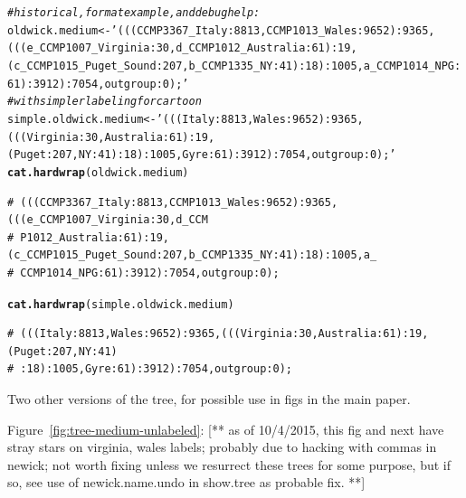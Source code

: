 \documentclass{article}\usepackage[]{graphicx}\usepackage[]{color}
\makeatletter
\newcommand{\hlstr}[1]{\textcolor[rgb]{0.192,0.494,0.8}{#1}}%
\newcommand{\hlcom}[1]{\textcolor[rgb]{0.678,0.584,0.686}{\textit{#1}}}%
\newcommand{\hlstd}[1]{\textcolor[rgb]{0.345,0.345,0.345}{#1}}%
\newcommand{\hlkwb}[1]{\textcolor[rgb]{0.69,0.353,0.396}{#1}}%
\newcommand{\hlkwd}[1]{\textcolor[rgb]{0.737,0.353,0.396}{\textbf{#1}}}%
\newenvironment{kframe}{%
 \def\at@end@of@kframe{}%
 \ifinner\ifhmode%
  \def\at@end@of@kframe{\end{minipage}}%
  \begin{minipage}{\columnwidth}%
 \fi\fi%
 \def\FrameCommand##1{\hskip\@totalleftmargin \hskip-\fboxsep
 \colorbox{shadecolor}{##1}\hskip-\fboxsep
     \hskip-\linewidth \hskip-\@totalleftmargin \hskip\columnwidth}%
 \MakeFramed {\advance\hsize-\width
   \@totalleftmargin\z@ \linewidth\hsize
   \@setminipage}}%
 {\par\unskip\endMakeFramed%
 \at@end@of@kframe}
\newenvironment{knitrout}{}{} %
\makeatother
\begin{document}
\begin{knitrout}
\begin{kframe}
\begin{alltt}
\hlcom{# historical, format example, and debug help:}
\hlstd{oldwick.medium} \hlkwb{<-} \hlstr{'(((CCMP3367_Italy:8813,CCMP1013_Wales:9652):9365,(((e_CCMP1007_Virginia:30,d_CCMP1012_Australia:61):19,(c_CCMP1015_Puget_Sound:207,b_CCMP1335_NY:41):18):1005,a_CCMP1014_NPG:61):3912):7054,outgroup:0);'}
\hlcom{# with simpler labeling for cartoon}
\hlstd{simple.oldwick.medium} \hlkwb{<-} \hlstr{'(((Italy:8813,Wales:9652):9365,(((Virginia:30,Australia:61):19,(Puget:207,NY:41):18):1005,Gyre:61):3912):7054,outgroup:0);'}
\hlkwd{cat.hardwrap}\hlstd{(oldwick.medium)}
\end{alltt}
\begin{verbatim}
# (((CCMP3367_Italy:8813,CCMP1013_Wales:9652):9365,(((e_CCMP1007_Virginia:30,d_CCM 
# P1012_Australia:61):19,(c_CCMP1015_Puget_Sound:207,b_CCMP1335_NY:41):18):1005,a_ 
# CCMP1014_NPG:61):3912):7054,outgroup:0);
\end{verbatim}
\begin{alltt}
\hlkwd{cat.hardwrap}\hlstd{(simple.oldwick.medium)}
\end{alltt}
\begin{verbatim}
# (((Italy:8813,Wales:9652):9365,(((Virginia:30,Australia:61):19,(Puget:207,NY:41) 
# :18):1005,Gyre:61):3912):7054,outgroup:0);
\end{verbatim}
\end{kframe}
\end{knitrout}

Two other versions of the tree, for possible use in figs in the main paper.

Figure~\ref{fig:tree-medium-unlabeled}:  [** as of 10/4/2015, this fig and next have stray stars on virginia, wales labels; probably due to hacking with commas in newick; not worth fixing unless we resurrect these trees for some purpose, but if so, see use of newick.name.undo in show.tree as probable fix. **]
\end{document}
